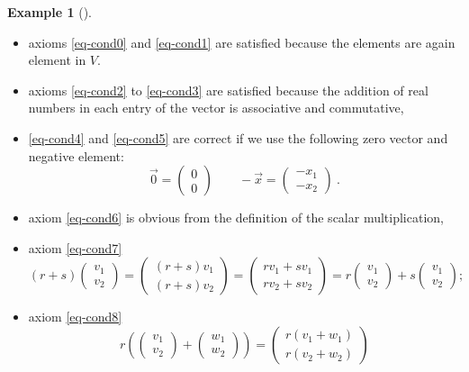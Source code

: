 \documentclass[
  a4paper,
  DIV=11,
  numbers=noendperiod,
  oneside]{scrreprt}
\providecommand{\tightlist}{%
  \setlength{\itemsep}{0pt}\setlength{\parskip}{0pt}}
\theoremstyle{definition}
\newtheorem{example}{Example}[chapter]
\theoremstyle{remark}
\begin{document}
\begin{example}[]
\begin{itemize}
\tightlist
\item
  axioms \ref{eq-cond0} and \ref{eq-cond1} are satisfied because the
  elements are again element in \(V\).
\item
  axioms \ref{eq-cond2} to \ref{eq-cond3} are satisfied because the
  addition of real numbers in each entry of the vector is associative
  and commutative,
\item
  \ref{eq-cond4} and \ref{eq-cond5} are correct if we use the following
  zero vector and negative element:
  \[\vec{0}=\scriptstyle \begin{pmatrix}   0\\0  \end{pmatrix} \textstyle \qquad   -\vec{x} = \scriptstyle \begin{pmatrix}   -x_{1}\\-x_{2}  \end{pmatrix} \textstyle \ .\]
\item
  axiom \ref{eq-cond6} is obvious from the definition of the scalar
  multiplication,
\item
  axiom \ref{eq-cond7}
  \[(r+s) \begin{pmatrix}   v_1 \\ v_2  \end{pmatrix} 
    =\begin{pmatrix}   (r+s)v_1 \\ (r+s)v_2  \end{pmatrix} 
    = \begin{pmatrix}   rv_1+sv_1 \\ rv_2+sv_2  \end{pmatrix} 
    =r \begin{pmatrix}   v_1 \\ v_2  \end{pmatrix} +s \begin{pmatrix}   v_1 \\ v_2  \end{pmatrix}; \]
\item
  axiom \ref{eq-cond8}
  \[r \left( \begin{pmatrix}   v_1 \\ v_2  \end{pmatrix} + \begin{pmatrix}   w_1 \\ w_2  \end{pmatrix} \right)
    =\begin{pmatrix}   r(v_1+w_1) \\ r(v_2+w_2)  \end{pmatrix} 
\]
\end{itemize}
\end{example}
\end{document}
